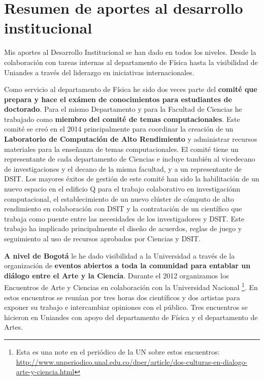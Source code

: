 \documentclass[letterpaper,12pt,onecolumn]{article}
\begin{document}
\pagestyle{empty}
\section*{{\Large{\sc Resumen de aportes al desarrollo institucional}}}

Mis aportes al Desarrollo Institucional se han dado en todos los
niveles. Desde la colaboraci\'on con tareas internas al departamento de
F\'isica hasta la visibilidad de Uniandes a trav\'es del liderazgo
en iniciativas internacionales. 

Como servicio al departamento de F\'isica he sido dos veces parte del
{\bf comit\'e que prepara y hace el ex\'amen de conocimientos para estudiantes
de doctorado}.  Para el mismo Departamento y para la Facultad de
Ciencias he trabajado como {\bf miembro del comit\'e de temas
computacionales}. Este comit\'e se cre\'o en el 2014 principalmente
para coordinar la creaci\'on de un {\bf Laboratorio de Computaci\'on de
Alto Rendimiento} y administrar recursos materiales para la ense\~nanza
de temas computacionales. El comit\'e tiene un representante de cada
departamento de Ciencias e incluye tambi\'en al vicedecano de
investigaciones y el decano de la misma facultad, y a un
representante de DSIT. Los mayores \'exitos de gesti\'on de este
comit\'e han sido la habilitaci\'on de un nuevo espacio en el edificio
Q para el trabajo colaborativo en investigaci\'onn computacional, el
establecimiento de un nuevo cl\'uster de c\'omputo de alto rendimiento en
colaboraci\'on con DSIT y la contrataci\'on de un cient\'ifico que trabaja
como puente entre las necesidades de los investigadores y DSIT. Este
trabajo ha implicado principalmente el dise\~no de acuerdos, reglas de
juego y seguimiento al uso de recursos aprobados por Ciencias y DSIT.

{\bf A nivel de Bogot\'a} le he dado visibilidad a la Universidad a trav\'es de
la organizaci\'on de {\bf eventos abiertos a toda la comunidad para
entablar un di\'alogo entre el Arte y la Ciencia}. Durante el 2012
organizamos los Encuentros de Arte y Ciencias en colaboraci\'on con la
Universidad Nacional \footnote{Esta es una note en el peri\'odico de la UN sobre estos encuentros: \url{http://www.unperiodico.unal.edu.co/dper/article/dos-culturas-en-dialogo-arte-y-ciencia.html}}. En estos encuentros se reun\'ian por tres horas
dos cient\'ificos y dos artistas para exponer su trabajo e intercambiar
opiniones con el p\'ublico. Tres encuentros se hicieron en Uniandes
con apoyo del departamento de F\'isica y el departamento de Artes. 
\end{document}
